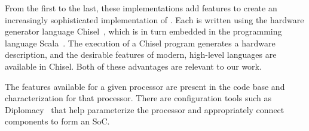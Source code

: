 \documentclass[conference]{IEEEtran}
\begin{document}
From the first to the last, these implementations add features to create an increasingly sophisticated implementation of \Riscv{}.  Each is written using the hardware generator language Chisel~\cite{chisel:book}, which is in turn embedded in the programming language Scala~\cite{scala-overview-tech-report}.  The execution of a Chisel program generates a hardware description, and the desirable features of modern, high-level languages are available in Chisel.  Both of these advantages are relevant to our work.

The features available for a given \Riscv{} processor are present in the code base and characterization for that processor.   There are configuration tools such as Diplomacy~\cite{diplomacy} that help parameterize the \Rocketchip{} processor and appropriately connect components to form an SoC. 
\end{document}
